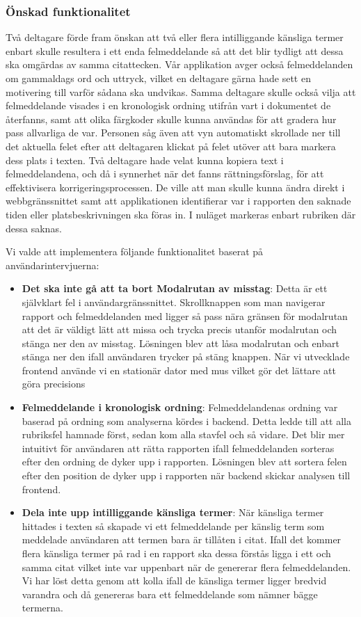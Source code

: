 \documentclass[swedish]{maucsthesis}
\begin{document}
\subsubsection{Önskad funktionalitet}\label{önskvärdafunktioner}

Två deltagare förde fram önskan att två eller flera intilliggande känsliga
termer enbart skulle resultera i ett enda felmeddelande så att det blir tydligt
att dessa ska omgärdas av samma citattecken. Vår applikation avger också
felmeddelanden om gammaldags ord och uttryck, vilket en deltagare gärna hade
sett en motivering till varför sådana ska undvikas. Samma deltagare skulle också
vilja att felmeddelande visades i en kronologisk ordning utifrån vart i
dokumentet de återfanns, samt att olika färgkoder skulle kunna användas för att
gradera hur pass allvarliga de var. Personen såg även att vyn automatiskt
skrollade ner till det aktuella felet efter att deltagaren klickat på felet
utöver att bara markera dess plats i texten. Två deltagare hade velat kunna
kopiera text i felmeddelandena, och då i synnerhet när det fanns
rättningsförslag, för att effektivisera korrigeringsprocessen. De ville att man
skulle kunna ändra direkt i webbgränssnittet samt att applikationen identifierar
var i rapporten den saknade tiden eller platsbeskrivningen ska föras in. I
nuläget markeras enbart rubriken där dessa saknas.

Vi valde att implementera följande funktionalitet baserat på
användarintervjuerna:

\begin{itemize}
\item \textbf{Det ska inte gå att ta bort Modalrutan av misstag}: Detta är ett
  självklart fel i användargränssnittet. Skrollknappen som man navigerar
  rapport och felmeddelanden med ligger så pass nära gränsen för modalrutan att
  det är väldigt lätt att missa och trycka precis utanför modalrutan och stänga
  ner den av misstag. Lösningen blev att låsa modalrutan och enbart stänga ner
  den ifall användaren trycker på stäng knappen. När vi utvecklade frontend
  använde vi en stationär dator med mus vilket gör det lättare att göra precisions
\item \textbf{Felmeddelande i kronologisk ordning}: Felmeddelandenas ordning var
  baserad på ordning som analyserna kördes i backend. Detta ledde till att alla
  rubriksfel hamnade först, sedan kom alla stavfel och så vidare. Det blir mer
  intuitivt för användaren att rätta rapporten ifall felmeddelanden sorteras
  efter den ordning de dyker upp i rapporten. Lösningen blev att sortera felen
  efter den position de dyker upp i rapporten när backend skickar analysen till
  frontend.
\item \textbf{Dela inte upp intilliggande känsliga termer}: När känsliga termer
  hittades i texten så skapade vi ett felmeddelande per känslig term som
  meddelade användaren att termen bara är tillåten i citat. Ifall det kommer
  flera känsliga termer på rad i en rapport ska dessa förstås ligga i ett och
  samma citat vilket inte var uppenbart när de genererar flera felmeddelanden.
  Vi har löst detta genom att kolla ifall de känsliga termer ligger bredvid
  varandra och då genereras bara ett felmeddelande som nämner bägge termerna.
\end{itemize}
\end{document}
